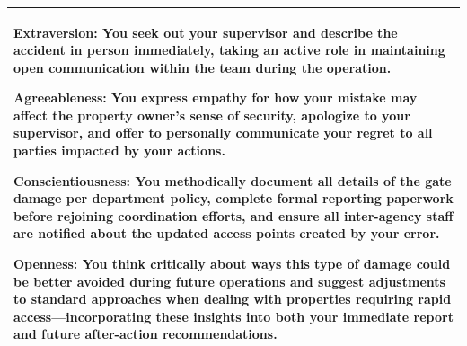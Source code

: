 \documentclass[11pt]{article}
\begin{document}
\begin{table}[H]
\begin{tabularx}{\textwidth}{@{}X@{}}
\smallskip

\textbf{\textcolor{hexX}{Extraversion}:} You seek out your supervisor and describe the accident in person immediately, taking an active role in maintaining open communication within the team during the operation.

\smallskip

\textbf{\textcolor{hexA}{Agreeableness}:} You express empathy for how your mistake may affect the property owner's sense of security, apologize to your supervisor, and offer to personally communicate your regret to all parties impacted by your actions.

\smallskip

\textbf{\textcolor{hexC}{Conscientiousness}:} You methodically document all details of the gate damage per department policy, complete formal reporting paperwork before rejoining coordination efforts, and ensure all inter-agency staff are notified about the updated access points created by your error.

\smallskip

\textbf{\textcolor{hexO}{Openness}:} You think critically about ways this type of damage could be better avoided during future operations and suggest adjustments to standard approaches when dealing with properties requiring rapid access—incorporating these insights into both your immediate report and future after-action recommendations. \\
\bottomrule
\end{tabularx}
\end{table}



\end{document}
